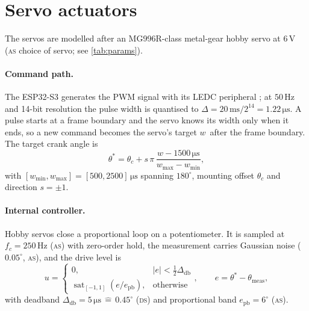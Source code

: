 \documentclass[10pt,a4paper]{article}
\newcommand{\un}[1]{\,\mathrm{#1}}
\newcommand{\tagDS}{\textsc{ds}}
\newcommand{\tagAS}{\textsc{as}}
\begin{document}
\section{Servo actuators}\label{sec:servo}
The servos are modelled after an MG996R-class metal-gear hobby servo at $6\un{V}$
\citep{mg996r} (\tagAS{} choice of servo; see \cref{tab:params}).

\paragraph{Command path.} The ESP32-S3 generates the PWM signal with its LEDC peripheral
\citep{esp32s3trm}; at $50\un{Hz}$ and 14-bit resolution the pulse width is quantised to
$\Delta=20\un{ms}/2^{14}=1.22\un{\mu s}$. A pulse starts at a frame boundary and the servo knows
its width only when it ends, so a new command becomes the servo's target $w\,$ after the frame
boundary. The target crank angle is
\begin{equation}
  \theta^*=\theta_c+s\,\pi\,\frac{w-1500\un{\mu s}}{w_{\max}-w_{\min}},
\end{equation}
with $[w_{\min},w_{\max}]=[500,2500]\un{\mu s}$ spanning $180^\circ$, mounting offset
$\theta_c$ and direction $s=\pm1$.

\paragraph{Internal controller.} Hobby servos close a proportional loop on a potentiometer. It
is sampled at $f_c=250\un{Hz}$ (\tagAS) with zero-order hold, the measurement carries Gaussian
noise ($0.05^\circ$, \tagAS), and the drive level is
\begin{equation}
  u=\begin{cases}0, & |e|<\tfrac12\Delta_{\mathrm{db}}\\ \operatorname{sat}_{[-1,1]}\!\left(e/e_{\mathrm{pb}}\right), & \text{otherwise}\end{cases},
  \qquad e=\theta^*-\theta_{\mathrm{meas}},
\end{equation}
with deadband $\Delta_{\mathrm{db}}=5\un{\mu s}\,\widehat{=}\,0.45^\circ$ (\tagDS) and
proportional band $e_{\mathrm{pb}}=6^\circ$ (\tagAS).
\end{document}
